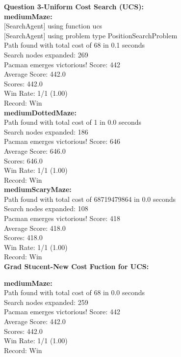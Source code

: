 \documentclass[11pt]{article}
\begin{document}
\newpage
\noindent
\textbf{Question 3-Uniform Cost Search (UCS):}\\
\textbf{mediumMaze:}\\
$[$SearchAgent$]$ using function ucs\\
$[$SearchAgent$]$ using problem type PositionSearchProblem\\
Path found with total cost of 68 in 0.1 seconds\\
Search nodes expanded: 269\\
Pacman emerges victorious! Score: 442\\
Average Score: 442.0\\
Scores:        442.0\\
Win Rate:      1/1 (1.00)\\
Record:        Win\\

\noindent
\textbf{mediumDottedMaze:}\\
Path found with total cost of 1 in 0.0 seconds\\
Search nodes expanded: 186\\
Pacman emerges victorious! Score: 646\\
Average Score: 646.0\\
Scores:        646.0\\
Win Rate:      1/1 (1.00)\\
Record:        Win\\

\noindent
\textbf{mediumScaryMaze:}\\
Path found with total cost of 68719479864 in 0.0 seconds\\
Search nodes expanded: 108\\
Pacman emerges victorious! Score: 418\\
Average Score: 418.0\\
Scores:        418.0\\
Win Rate:      1/1 (1.00)\\
Record:        Win\\

\newpage
\noindent
\textbf{Grad Stucent-New Cost Fuction for UCS:}

\noindent
\textbf{mediumMaze:}\\
Path found with total cost of 68 in 0.0 seconds\\
Search nodes expanded: 259\\
Pacman emerges victorious! Score: 442\\
Average Score: 442.0\\
Scores:        442.0\\
Win Rate:      1/1 (1.00)\\
Record:        Win\\
\end{document}
